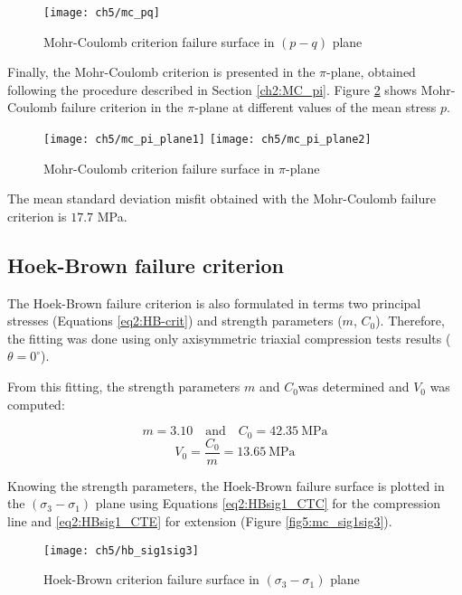 \begin{figure}[p]
    \centering
    \texttt{[image: ch5/mc\_pq]}
    \caption{Mohr-Coulomb criterion failure surface in  $(p-q)$ plane}
    \label{fig5:mc_pq}
\end{figure} 

Finally, the Mohr-Coulomb criterion is presented in the $\pi$-plane, obtained following the procedure described in Section \ref{ch2:MC_pi}. Figure \ref{fig5:mc_pi_plane} shows Mohr-Coulomb failure criterion in the $\pi$-plane at different values of the mean stress $p$.

\begin{figure}[tb]
    \centering
    \texttt{[image: ch5/mc\_pi\_plane1]}
    \texttt{[image: ch5/mc\_pi\_plane2]}
    \caption{Mohr-Coulomb criterion failure surface in  $\pi$-plane}
    \label{fig5:mc_pi_plane}
\end{figure} 

The mean standard deviation misfit obtained with the Mohr-Coulomb failure criterion is $17.7$ \si{\mega\pascal}. 

\subsection{Hoek-Brown failure criterion}

The Hoek-Brown failure criterion is also formulated in terms two principal stresses (Equations \ref{eq2:HB-crit}) and strength parameters ($m$, $C_0$). Therefore, the fitting was done using only axisymmetric triaxial compression tests results ($\theta = 0^\circ$). 

From this fitting, the strength parameters $m$ and $C_0$was determined and $V_0$ was computed: 

\begin{equation}
    m = 3.10 \quad \textrm{and} \quad C_0 = \SI{42.35}{\mega\pascal}
\end{equation}
\begin{equation}
    V_0 = \frac{C_0}{m} = \SI{13.65}{\mega\pascal}
\end{equation}

Knowing the strength parameters, the Hoek-Brown failure surface is plotted in the $(\sigma_3-\sigma_1)$ plane using Equations \ref{eq2:HBsig1_CTC} for the compression line and \ref{eq2:HBsig1_CTE} for extension (Figure \ref{fig5:mc_sig1sig3}).

\begin{figure}[p]
    \centering
    \texttt{[image: ch5/hb\_sig1sig3]}
    \caption{Hoek-Brown criterion failure surface in  $(\sigma_3-\sigma_1)$ plane}
    \label{fig5:hb_sig1sig3}
\end{figure} 

